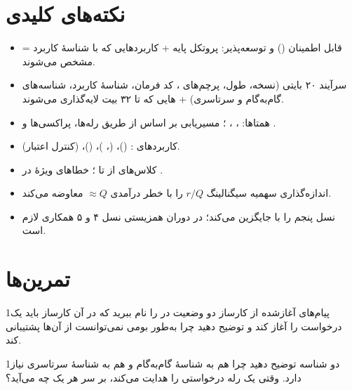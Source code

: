 \documentclass[11pt,a4paper]{article}
\begin{document}
\section{نکته‌های کلیدی}
\begin{takeawaybox}
\begin{itemize}
  \item {} =  قابل اطمینان () و توسعه‌پذیر: پروتکل پایه + کاربردهایی که با شناسهٔ
        کاربرد مشخص می‌شوند.
  \item سرآیند ۲۰ بایتی (نسخه، طول، پرچم‌های ، کد فرمان، شناسهٔ کاربرد، شناسه‌های گام‌به‌گام و سرتاسری)
        + هایی که تا ۳۲ بیت لایه‌گذاری می‌شوند.
  \item همتاها: ، ، ؛ مسیریابی بر اساس  از طریق رله‌ها،
        پراکسی‌ها و .
  \item کاربردهای :  ()،  (، )، 
        ()،  (کنترل اعتبار).
  \item کلاس‌های  از  تا ؛ خطاهای ویژهٔ  در .
  \item اندازه‌گذاری سهمیه سیگنالینگ $r/Q$ را با خطر درآمدی $\approx Q$ معاوضه می‌کند.
  \item نسل پنجم  را با  جایگزین می‌کند؛ در دوران همزیستی نسل ۴ و ۵ همکاری لازم است.
\end{itemize}
\end{takeawaybox}

\section{تمرین‌ها}

\begin{exercisebox}{1}{پیام‌های آغازشده از کارساز}\label{exr:srv}
دو وضعیت در  را نام ببرید که در آن کارساز باید یک درخواست  را آغاز کند و توضیح دهید چرا
 به‌طور بومی نمی‌توانست از آن‌ها پشتیبانی کند.
\end{exercisebox}

\begin{exercisebox}{1}{دو شناسه}\label{exr:ids}
توضیح دهید چرا  هم به شناسهٔ گام‌به‌گام و هم به شناسهٔ سرتاسری نیاز دارد. وقتی یک رله درخواستی را هدایت
می‌کند، بر سر هر یک چه می‌آید؟
\end{exercisebox}
\end{document}
